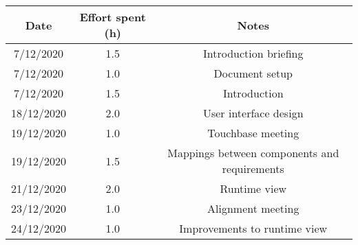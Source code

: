 \documentclass[../../main.tex]{subfiles}
\begin{document}
\begin{center}
    \begin{tabular}{|c| |c| |c|} 
        \hline
        Date & Effort spent (h) & Notes\\ [0.5ex] 
        \hline\hline
        7/12/2020 & 1.5 & Introduction briefing\\ 
        7/12/2020 & 1.0 & Document setup\\
        7/12/2020 & 1.5 & Introduction\\
        18/12/2020 & 2.0 & User interface design\\
        19/12/2020 & 1.0 & Touchbase meeting\\
        19/12/2020 & 1.5 & Mappings between components and requirements\\
        21/12/2020 & 2.0 & Runtime view\\
        23/12/2020 & 1.0 & Alignment meeting\\
        24/12/2020 & 1.0 & Improvements to runtime view\\
        \hline
    \end{tabular}
\end{center}
\end{document}
